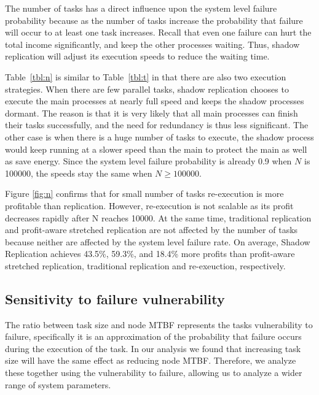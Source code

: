The number of tasks has a direct influence upon the system level
failure probability because as the number of tasks increase the
probability that failure will occur to at least one task
increases. Recall that even one failure can hurt the total income
significantly, and keep the other processes waiting. Thus, shadow
replication will adjust its execution speeds to reduce the waiting
time.

Table~\ref{tbl:n} is similar to Table~\ref{tbl:t} in that there are also two execution strategies. When there are few parallel tasks, shadow
replication chooses to execute the main processes at nearly full speed and keeps
the shadow processes dormant. The
reason is that it is very likely that all main processes can finish
their tasks successfully, and the need for redundancy is thus less
significant. The other case is when there is a huge number of
tasks to execute, the shadow process would keep running at a slower speed than the main to protect the main as well as save energy. Since the system level failure probability is already 0.9 when $N$ is 100000, the speeds stay the same when $N \ge 100000$.

Figure \ref{fig:n} confirms that for small number of tasks
re-execution is more profitable than replication. However, re-execution is not scalable
as its profit decreases rapidly after N reaches 10000. At the same time, traditional
replication and profit-aware stretched replication are not
affected by the number of tasks because neither are affected by the
system level failure rate. On average, Shadow Replication achieves 43.5\%, 59.3\%, and 18.4\%
more profits than profit-aware stretched replication, traditional replication and re-exeuction, respectively. 

\subsection{Sensitivity to failure vulnerability}

The ratio between task size and node MTBF represents the tasks
vulnerability to failure, specifically it is an approximation of the
probability that failure occurs during the execution of the task. In our
analysis we found that increasing task size will have the same effect
as reducing node MTBF. Therefore, we analyze these together using the
vulnerability to failure, allowing us to analyze a wider range of
system parameters.

